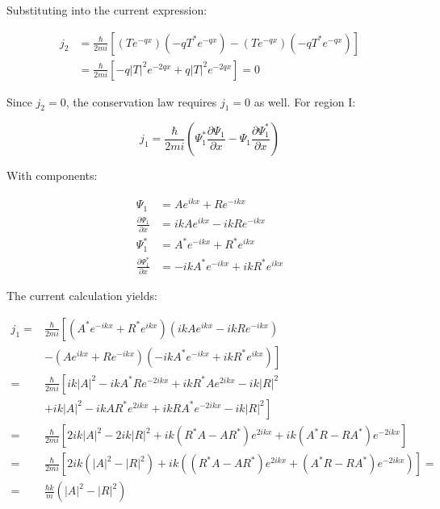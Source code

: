 \documentclass[italian]{HKNdocument}
\begin{document}
Substituting into the current expression:

\begin{align*}
j_{2} & =\frac{\hbar}{2 m i}\left[\left(T e^{-q x}\right)\left(-q T^{*} e^{-q x}\right)-\left(T e^{-q x}\right)\left(-q T^{*} e^{-q x}\right)\right] \\
& =\frac{\hbar}{2 m i}\left[-q|T|^{2} e^{-2 q x}+q|T|^{2} e^{-2 q x}\right]=0 \tag{6.45}
\end{align*}

Since $j_2 = 0$, the conservation law requires $j_1 = 0$ as well. For region I:

\begin{equation*}
j_{1}=\frac{\hbar}{2 m i}\left(\Psi_{1}^{*} \frac{\partial \Psi_{1}}{\partial x}-\Psi_{1} \frac{\partial \Psi_{1}^{*}}{\partial x}\right) \tag{6.46}
\end{equation*}

With components:

\begin{align*}
\Psi_{1} & =A e^{i k x}+R e^{-i k x} \\
\frac{\partial \Psi_{1}}{\partial x} & =i k A e^{i k x}-i k R e^{-i k x}  \tag{6.47}\\
\Psi_{1}^{*} & =A^{*} e^{-i k x}+R^{*} e^{i k x} \\
\frac{\partial \Psi_{1}^{*}}{\partial x} & =-i k A^{*} e^{-i k x}+i k R^{*} e^{i k x}
\end{align*}

The current calculation yields:

\begin{align*}
j_{1}= & \frac{\hbar}{2 m i}\left[\left(A^{*} e^{-i k x}+R^{*} e^{i k x}\right)\left(i k A e^{i k x}-i k R e^{-i k x}\right)\right. \\
& \left.-\left(A e^{i k x}+R e^{-i k x}\right)\left(-i k A^{*} e^{-i k x}+i k R^{*} e^{i k x}\right)\right] \\
= & \frac{\hbar}{2 m i}\left[i k|A|^{2}-i k A^{*} R e^{-2 i k x}+i k R^{*} A e^{2 i k x}-i k|R|^{2}\right. \\
& \left.+i k|A|^{2}-i k A R^{*} e^{2 i k x}+i k R A^{*} e^{-2 i k x}-i k|R|^{2}\right] \\
= & \frac{\hbar}{2 m i}\left[2 i k|A|^{2}-2 i k|R|^{2}+i k\left(R^{*} A-A R^{*}\right) e^{2 i k x}+i k\left(A^{*} R-R A^{*}\right) e^{-2 i k x}\right] \\
= & \frac{\hbar}{2 m i}\left[2 i k\left(|A|^{2}-|R|^{2}\right)+i k\left(\left(R^{*} A-A R^{*}\right) e^{2 i k x}+\left(A^{*} R-R A^{*}\right) e^{-2 i k x}\right)\right]= \\
= & \frac{\hbar k}{m}\left(|A|^{2}-|R|^{2}\right) \tag{6.48}
\end{align*}
\end{document}
